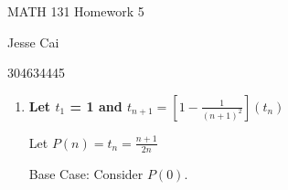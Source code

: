 \documentclass[10pt,a4paper]{article}
\begin{document}
MATH 131 Homework 5

Jesse Cai

304634445

\begin{enumerate}
    \item \textbf{Let $t_1$ = 1 and $t_{n+1} = [1 - \frac{1}{(n+1)^2}] (t_n)$}


        Let $P(n)  = t_n = \frac{n+1}{2n}$

        Base Case: Consider $P(0)$. 




\end{enumerate}
\end{document}
